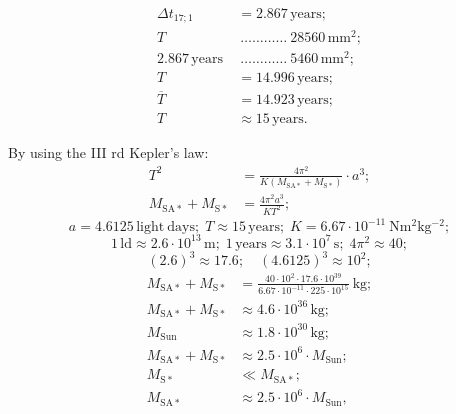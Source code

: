 \begin{description}
\begin{align*}
    \Delta t_{17;1} &= 2.867\,\mathrm{years};\\
    T\ &\ \dots\dots\dots\dots\ 28560\,\mathrm{mm}^2;\\
    2.867\,\mathrm{years}\ &\ \dots\dots\dots\dots\ 5460\,\mathrm{mm}^2;\\
    T &= 14.996\,\mathrm{years};\\
    \overline{T} &= 14.923\,\mathrm{years};\\
    T &\approx 15\,\mathrm{years}.
  \end{align*}
\item[c)] By using the III rd Kepler's law:
  \begin{align*}
    T^2 &= \frac{4\pi^2}{K(M_{\mathrm{SA}*} + M_{\mathrm{S}*})}\cdot a^3;\\
    M_{\mathrm{SA}*} + M_{\mathrm{S}*} &= \frac{4\pi^2 a^3}{KT^2};
  \end{align*}
  \[
    a = 4.6125\,\mathrm{light\ days};\;
    T \approx 15\,\mathrm{years};\;
    K = 6.67\cdot10^{-11}\ \mathrm{Nm^2kg^{-2}};
  \]
  \[
    1\,\mathrm{ld} \approx 2.6\cdot10^{13}\,\mathrm{m};\;
    1\,\mathrm{years} \approx 3.1\cdot10^{7}\,\mathrm{s};\;
    4\pi^2 \approx 40;
  \]
  \[
    (2.6)^3 \approx 17.6;\quad (4.6125)^3 \approx 10^2;
  \]
  \begin{align*}
    M_{\mathrm{SA}*} + M_{\mathrm{S}*}
      &= \frac{40\cdot10^{2}\cdot17.6\cdot10^{39}}
              {6.67\cdot10^{-11}\cdot225\cdot10^{15}}\ \mathrm{kg};\\
    M_{\mathrm{SA}*} + M_{\mathrm{S}*} &\approx 4.6\cdot10^{36}\,\mathrm{kg};\\
    M_{\mathrm{Sun}} &\approx 1.8\cdot10^{30}\,\mathrm{kg};
    \\
    M_{\mathrm{SA}*} + M_{\mathrm{S}*}
      &\approx 2.5\cdot10^{6}\cdot M_{\mathrm{Sun}};\\
    M_{\mathrm{S}*} &\ll M_{\mathrm{SA}*};\\
    M_{\mathrm{SA}*} &\approx 2.5\cdot10^{6}\cdot M_{\mathrm{Sun}},
  \end{align*}
\end{description}

